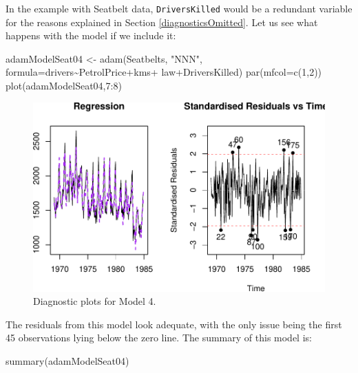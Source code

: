 \documentclass[
]{book}
\newenvironment{Shaded}{\begin{snugshade}}{\end{snugshade}}
\newcommand{\AttributeTok}[1]{\textcolor[rgb]{0.77,0.63,0.00}{#1}}
\newcommand{\DecValTok}[1]{\textcolor[rgb]{0.00,0.00,0.81}{#1}}
\newcommand{\FunctionTok}[1]{\textcolor[rgb]{0.00,0.00,0.00}{#1}}
\newcommand{\NormalTok}[1]{#1}
\newcommand{\OtherTok}[1]{\textcolor[rgb]{0.56,0.35,0.01}{#1}}
\newcommand{\SpecialCharTok}[1]{\textcolor[rgb]{0.00,0.00,0.00}{#1}}
\newcommand{\StringTok}[1]{\textcolor[rgb]{0.31,0.60,0.02}{#1}}
\theoremstyle{definition}
\theoremstyle{definition}
\theoremstyle{definition}
\theoremstyle{definition}
\theoremstyle{remark}
\begin{document}
In the example with Seatbelt data, \texttt{DriversKilled} would be a redundant variable for the reasons explained in Section \ref{diagnosticsOmitted}. Let us see what happens with the model if we include it:

\begin{Shaded}
\begin{Highlighting}[]
\NormalTok{adamModelSeat04 }\OtherTok{\textless{}{-}} \FunctionTok{adam}\NormalTok{(Seatbelts, }\StringTok{"NNN"}\NormalTok{, }
                        \AttributeTok{formula=}\NormalTok{drivers}\SpecialCharTok{\textasciitilde{}}\NormalTok{PetrolPrice}\SpecialCharTok{+}\NormalTok{kms}\SpecialCharTok{+}
\NormalTok{                          law}\SpecialCharTok{+}\NormalTok{DriversKilled)}
\FunctionTok{par}\NormalTok{(}\AttributeTok{mfcol=}\FunctionTok{c}\NormalTok{(}\DecValTok{1}\NormalTok{,}\DecValTok{2}\NormalTok{))}
\FunctionTok{plot}\NormalTok{(adamModelSeat04,}\DecValTok{7}\SpecialCharTok{:}\DecValTok{8}\NormalTok{)}
\end{Highlighting}
\end{Shaded}

\begin{figure}
\centering
\includegraphics{Svetunkov--2022----ADAM_files/figure-latex/adamModelSeat04-1.pdf}
\caption{\label{fig:adamModelSeat04}Diagnostic plots for Model 4.}
\end{figure}

The residuals from this model look adequate, with the only issue being the first 45 observations lying below the zero line. The summary of this model is:

\begin{Shaded}
\begin{Highlighting}[]
\FunctionTok{summary}\NormalTok{(adamModelSeat04)}
\end{Highlighting}
\end{Shaded}
\end{document}
